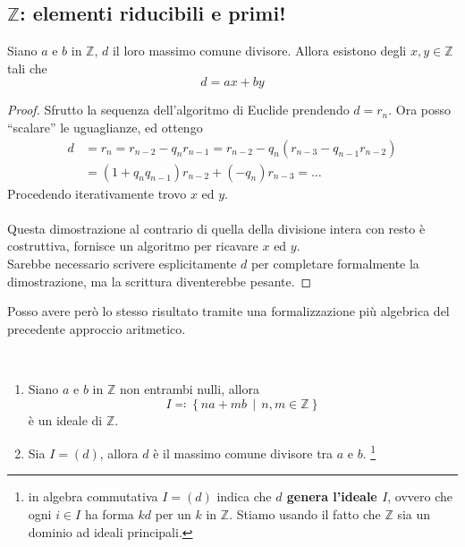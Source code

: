 \subsection{$\mathbb{Z}$: elementi riducibili e primi!}
\begin{teorema} Siano $a$ e $b$ in $\mathbb{Z}$, $d$ il loro massimo comune divisore. Allora esistono degli $x,y \in \mathbb{Z}$ tali che
	\begin{equation*}
	d=ax+by
	\end{equation*}
\end{teorema}
\begin{proof}
	Sfrutto la sequenza dell'algoritmo di Euclide prendendo $d=r_n$. Ora posso \enquote{scalare} le uguaglianze, ed ottengo
	\begin{align*}
	d &  = r_n = r_{n-2}-q_nr_{n-1}= r_{n-2}-q_n(r_{n-3}-q_{n-1}r_{n-2}) \\ 
	& = (1+q_nq_{n-1})r_{n-2}+(-q_n)r_{n-3} = \dots
	\end{align*}
	Procedendo iterativamente trovo $x$ ed $y$. \\ \\ Questa dimostrazione al contrario di quella della divisione intera con resto è costruttiva, fornisce un algoritmo per ricavare $x$ ed $y$. \\ Sarebbe necessario scrivere esplicitamente $d$ per completare formalmente la dimostrazione, ma la scrittura diventerebbe pesante.
\end{proof}
Posso avere però lo stesso risultato tramite una formalizzazione più algebrica del precedente approccio aritmetico.
\begin{teorema} \
	\begin{enumerate}
		\item Siano $a$ e $b$ in $\mathbb{Z}$ non entrambi nulli, allora 
		\begin{equation*}
		I \eqqcolon \left\{na+mb \, \middle| \, n,m \in \mathbb{Z}\right\}
		\end{equation*}
		è un ideale di $\mathbb{Z}$.
		\item Sia $I = (d)$, allora $d$ è il massimo comune divisore tra $a$ e $b$. \footnote{in algebra commutativa $I=(d)$ indica che \textbf{$d$ genera l'ideale $I$}, ovvero che ogni $i \in I$ ha forma $kd$ per un $k$ in $\mathbb{Z}$. Stiamo usando il fatto che $\mathbb{Z}$ sia un dominio ad ideali principali.}
	\end{enumerate}
\end{teorema}
